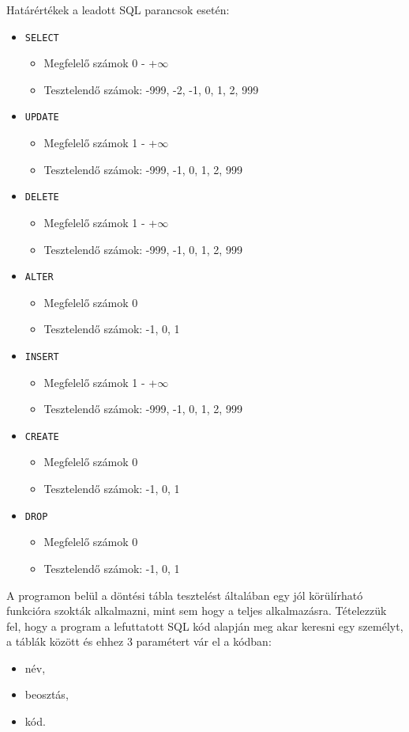 Határértékek a leadott SQL parancsok esetén:
\begin{itemize}
	\item \texttt{SELECT}
		\begin{itemize}
			\item Megfelelő számok 0 - +$\infty$
			\item Tesztelendő számok: -999, -2, -1, 0, 1, 2, 999 
		\end{itemize}
	\item \texttt{UPDATE}
		\begin{itemize}
			\item Megfelelő számok 1 - +$\infty$
			\item Tesztelendő számok: -999, -1, 0, 1, 2, 999 
		\end{itemize}
	\item \texttt{DELETE}
		\begin{itemize}
			\item Megfelelő számok 1 - +$\infty$
			\item Tesztelendő számok: -999, -1, 0, 1, 2, 999 
		\end{itemize}
	\item \texttt{ALTER}
		\begin{itemize}
			\item Megfelelő számok 0
			\item Tesztelendő számok: -1, 0, 1
		\end{itemize}
	\item \texttt{INSERT}
		\begin{itemize}
			\item Megfelelő számok 1 - +$\infty$
			\item Tesztelendő számok: -999, -1, 0, 1, 2, 999 
		\end{itemize}
	\item \texttt{CREATE}
		\begin{itemize}
			\item Megfelelő számok 0
			\item Tesztelendő számok: -1, 0, 1
		\end{itemize}
	\item \texttt{DROP}
		\begin{itemize}
			\item Megfelelő számok 0
			\item Tesztelendő számok: -1, 0, 1
	\end{itemize}
\end{itemize}
\newpage
{} A programon belül a döntési tábla tesztelést általában egy jól körülírható funkcióra szokták alkalmazni, mint sem hogy a teljes alkalmazásra. Tételezzük fel, hogy a program a lefuttatott SQL kód alapján meg akar keresni egy személyt, a táblák között és ehhez 3 paramétert vár el a kódban:
\begin{itemize}
	\item név,
	\item beosztás,
	\item kód.
\end{itemize}


